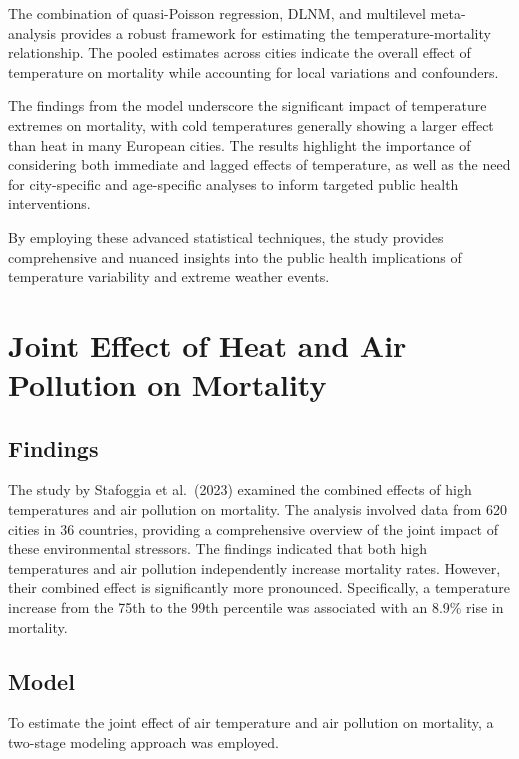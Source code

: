 \documentclass[
]{krantz}
\begin{document}
The combination of quasi-Poisson regression, DLNM, and multilevel meta-analysis provides a robust framework for estimating the temperature-mortality relationship. The pooled estimates across cities indicate the overall effect of temperature on mortality while accounting for local variations and confounders.

The findings from the model underscore the significant impact of temperature extremes on mortality, with cold temperatures generally showing a larger effect than heat in many European cities. The results highlight the importance of considering both immediate and lagged effects of temperature, as well as the need for city-specific and age-specific analyses to inform targeted public health interventions.

By employing these advanced statistical techniques, the study provides comprehensive and nuanced insights into the public health implications of temperature variability and extreme weather events.

\section{Joint Effect of Heat and Air Pollution on Mortality}\label{joint-effect-of-heat-and-air-pollution-on-mortality}

\subsection{Findings}\label{findings-1}

The study by Stafoggia et al.~(2023) examined the combined effects of high temperatures and air pollution on mortality. The analysis involved data from 620 cities in 36 countries, providing a comprehensive overview of the joint impact of these environmental stressors. The findings indicated that both high temperatures and air pollution independently increase mortality rates. However, their combined effect is significantly more pronounced. Specifically, a temperature increase from the 75th to the 99th percentile was associated with an 8.9\% rise in mortality.

\subsection{Model}\label{model-2}

To estimate the joint effect of air temperature and air pollution on mortality, a two-stage modeling approach was employed.
\end{document}
